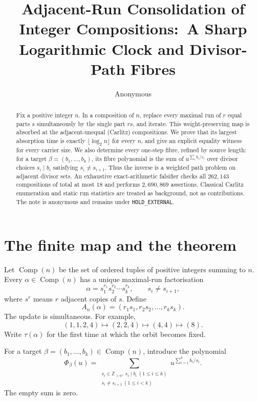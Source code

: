 \documentclass[a4paper,10pt]{amsart}
\title[Adjacent-run consolidation]{Adjacent-Run Consolidation of Integer Compositions:\
A Sharp Logarithmic Clock and Divisor-Path Fibres}
\author{Anonymous}
\date{}
\theoremstyle{remark}
\newcommand{\Comp}{\mathop{\mathrm{Comp}}}
\begin{document}
\begin{abstract}
Fix a positive integer $n$.  In a composition of $n$, replace every maximal
run of $r$ equal parts $s$ simultaneously by the single part $rs$, and
iterate.  This weight-preserving map is absorbed at the adjacent-unequal
(Carlitz) compositions.  We prove that its largest absorption time is exactly
$\lfloor\log_2 n\rfloor$ for every $n$, and give an explicit equality witness
for every carrier size.  We also determine every one-step fibre, refined by
source length: for a target $\beta=(b_1,\ldots,b_k)$, its fibre polynomial is
the sum of $u^{\sum_i b_i/s_i}$ over divisor choices $s_i\mid b_i$ satisfying
$s_i\ne s_{i+1}$.  Thus the inverse is a weighted path problem on adjacent
divisor sets.  An exhaustive exact-arithmetic falsifier checks all $262{,}143$
compositions of total at most $18$ and performs $2{,}690{,}869$ assertions.
Classical Carlitz enumeration and static run statistics are treated as
background, not as contributions.  The note is anonymous and remains under
\texttt{HOLD\_EXTERNAL}.
\end{abstract}

\maketitle

\section{The finite map and the theorem}

Let $\Comp(n)$ be the set of ordered tuples of positive integers summing to
$n$.  Every $\alpha\in\Comp(n)$ has a unique maximal-run factorisation
\[
  \alpha=s_1^{r_1}s_2^{r_2}\cdots s_k^{r_k},
  \qquad s_i\ne s_{i+1},
\]
where $s^r$ means $r$ adjacent copies of $s$.  Define
\begin{equation}\label{eq:map}
  A_n(\alpha)=(r_1s_1,r_2s_2,\ldots,r_ks_k).
\end{equation}
The update is simultaneous.  For example,
\[
 (1,1,2,4)\longmapsto(2,2,4)\longmapsto(4,4)
 \longmapsto(8).
\]
Write $\tau(\alpha)$ for the first time at which the orbit becomes fixed.

For a target $\beta=(b_1,\ldots,b_k)\in\Comp(n)$, introduce the polynomial
\begin{equation}\label{eq:fibrepoly}
 \Phi_\beta(u)=
 \sum_{\substack{s_i\in\mathbb Z_{>0},\ s_i\mid b_i\ (1\le i\le k)\\
                  s_i\ne s_{i+1}\ (1\le i<k)}}
 u^{\sum_{i=1}^k b_i/s_i}.
\end{equation}
The empty sum is zero.
\end{document}

